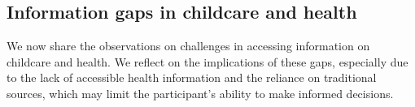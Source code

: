 

 
\subsection{Information gaps in childcare and health} 
We now share the observations on challenges in accessing information on childcare and health. We reflect on the implications of these gaps, especially due to the lack of accessible health information and the reliance on traditional sources, which may limit the participant's ability to make informed decisions.


